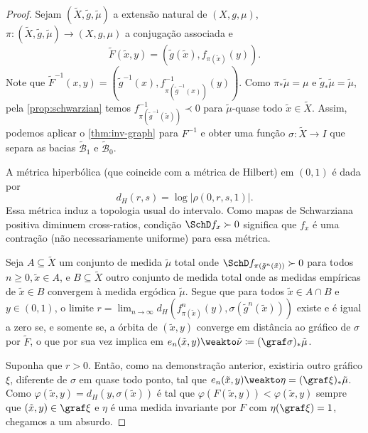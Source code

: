 \documentclass[../fapesp0]{subfiles}
\begin{document}
\begin{proof}
  \newcommand{\ex}{\tilde x}
  \newcommand{\eX}{\tilde X}
  \newcommand{\emu}{\tilde \mu}
  \newcommand{\enu}{\tilde \nu}
  \newcommand{\eg}{\tilde g}
  \newcommand{\eF}{\tilde F}
  \newcommand{\ef}{\tilde f}
  \newcommand{\eAu}{\tilde\mathcal{A}_1}
  \newcommand{\eAl}{\tilde\mathcal{A}_0}
  \newcommand{\eBu}{\tilde{\mathcal{B}}_1}
  \newcommand{\eBl}{\tilde{\mathcal{B}}_0}

  Sejam \((\eX, \eg,\emu)\) a extensão natural de \((X,g,\mu)\), \(\pi \colon (\eX, \eg,\emu) \to (X, g,\mu)\) a conjugação associada e
  \begin{equation*}
    \eF(\ex,y) = (\eg(\ex), f_{\pi(\ex)}(y)).
  \end{equation*}
  Note que \(\eF ^{-1}(x,y) = (\eg ^{-1}(x), f_{\pi(\eg^{-1}(x))}^{-1}(y))\). Como \(\pi_* \emu = \mu\) e \(\eg_*\emu = \emu\), pela \cref{prop:schwarzian} temos \(f_{\pi(\eg^{-1}(\ex))}^{-1} \prec 0\) para \(\emu\)-quase todo \(\ex \in \eX\). Assim, podemos aplicar o \cref{thm:inv-graph} para \(F^{-1}\) e obter uma função \(\sigma \colon \eX \to I\) que separa as bacias \(\eBu\) e \(\eBl\).

  A métrica hiperbólica (que coincide com a métrica de Hilbert) em \((0,1)\) é dada por \[d_H(r,s) = \log \lvert \rho(0,r,s,1) \rvert.\]
  Essa métrica induz a topologia usual do intervalo.
  Como mapas de Schwarziana positiva diminuem cross-ratios, condição \(\SchD f_x \succ 0\) significa que \(f_x\) é uma contração (não necessariamente uniforme) para essa métrica.

  Seja \(A \subseteq  \eX\) um conjunto de medida \(\emu\) total onde \(\SchD f_{\pi(\eg^n(\ex))} \succ 0\) para todos \(n \geq 0, \ex \in A\), e \(B \subseteq \eX\) outro conjunto de medida total onde as medidas empíricas de \(\ex \in B\) convergem à medida ergódica \(\emu\). Segue que para todos \(\ex \in A \cap B\) e \(y \in (0,1)\), o limite \(r = \lim_{n \to \infty} d_H(f_{\pi(\ex)}^n(y), \sigma(\eg^n(\ex)))\) existe e é igual a zero se, e somente se, a órbita de \((\ex,y)\) converge em distância ao gráfico de \(\sigma\) por \(\eF\), o que por sua vez implica em \(e_n(\ex, y) \weakto \enu \coloneqq (\graf \sigma)_* \emu\).

  Suponha que \(r > 0\). Então, como na demonstração anterior, existiria outro gráfico \(\xi\), diferente de \(\sigma\) em quase todo ponto, tal que \(e_n(\ex, y) \weakto \eta = (\graf \xi)_* \emu\). Como \(\varphi(\ex,y) = d_H(y, \sigma(\ex))\) é tal que \(\varphi(F(\ex, y)) < \varphi(\ex,y)\) sempre que \((\ex,y) \in \graf \xi\) e \(\eta\) é uma medida invariante por \(F\) com \(\eta(\graf \xi) = 1\), chegamos a um absurdo.


\end{proof}
\end{document}
